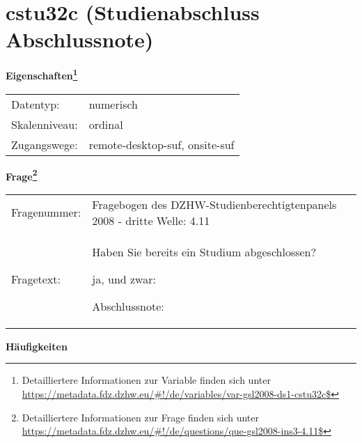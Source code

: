 
    \setcounter{footnote}{0}

    \vspace*{-1.8cm}
	\section{cstu32c (Studienabschluss Abschlussnote)}
	\label{section:cstu32c}



    \vspace*{0.5cm}
    \noindent\textbf{Eigenschaften\footnote{Detailliertere Informationen zur Variable finden sich unter
		\url{https://metadata.fdz.dzhw.eu/\#!/de/variables/var-gsl2008-ds1-cstu32c$}}}\\
	\begin{tabularx}{\hsize}{@{}lX}
	Datentyp: & numerisch \\
	Skalenniveau: & ordinal \\
	Zugangswege: &
	  remote-desktop-suf, 
	  onsite-suf
 \\
    \end{tabularx}



				\vspace*{0.5cm}
                \noindent\textbf{Frage\footnote{Detailliertere Informationen zur Frage finden sich unter
		              \url{https://metadata.fdz.dzhw.eu/\#!/de/questions/que-gsl2008-ins3-4.11$}}}\\
				\begin{tabularx}{\hsize}{@{}lX}
					Fragenummer: &
					  Fragebogen des DZHW-Studienberechtigtenpanels 2008 - dritte Welle:
					  4.11
 \\
					Fragetext: & Haben Sie bereits ein Studium abgeschlossen?\par  ja, und zwar:\par  Abschlussnote: \\
				\end{tabularx}





        		\vspace*{0.5cm}
                \noindent\textbf{Häufigkeiten}

